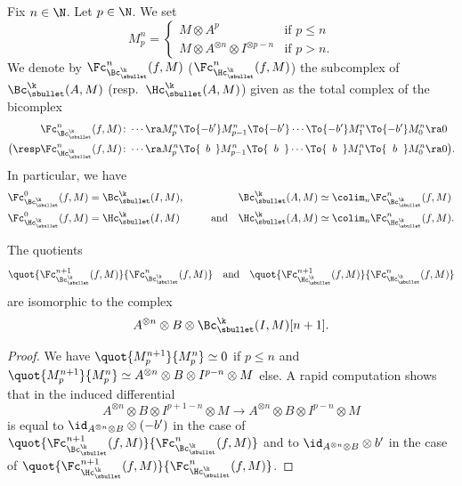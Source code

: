Fix $n \in \N$. Let $p \in \N$. We set
\[
M^n_p = \begin{cases}
M \otimes A^p & \text{if } p \leq n \\
M \otimes A^{\otimes n} \otimes I^{\otimes p-n} & \text{if } p > n.
\end{cases}
\]
We denote by $\Fc_{\Bc_\sbullet^\k}^n(f,M)$ (\resp $\Fc_{\Hc_\sbullet^\k}^n(f,M)$) the subcomplex of $\Bc_\sbullet^\k(A,M)$ (resp.\ $\Hc_\sbullet^\k(A,M)$) given as the total complex of the bicomplex
\begin{align*}
\Fc_{\Bc_\sbullet^\k}^n(f,M) \colon& \cdots \ra M^n_p \To{-b'} M^n_{p-1} \To{-b'} \cdots \To{-b'} M^n_1 \To{-b'} M^n_0 \ra 0 \\
\bigl(\resp \Fc_{\Hc_\sbullet^\k}^n(f,M) \colon& \cdots \ra M^n_p \To{\hspace*{1.7mm}b\hspace*{1.7mm}} M^n_{p-1} \To{\hspace*{1.9mm}b\hspace*{1.9mm}} \cdots \To{\hspace*{1.8mm}b\hspace*{1.9mm}} M^n_1 \To{\hspace*{2mm}b\hspace*{2mm}} M^n_0 \ra 0  \bigr).
\end{align*}
In particular, we have
\begin{align*}
\Fc_{\Bc_\sbullet^\k}^0(f,M) &= \Bc_\sbullet^\k(I,M) \text{, }& \Bc_\sbullet^\k(A,M) &\simeq \colim_n \Fc_{\Bc_\sbullet^\k}^n(f,M) \\
\Fc_{\Hc_\sbullet^\k}^0(f,M) &= \Hc_\sbullet^\k(I,M)\qquad\quad\text{and}& \Hc_\sbullet^\k(A,M) &\simeq \colim_n \Fc_{\Hc_\sbullet^\k}^n(f,M).
\end{align*}
\begin{lem}\label{lem:filtrationF}
The quotients
\[
\quot{\Fc_{\Bc_\sbullet^\k}^{n+1}(f,M)}{\Fc_{\Bc_\sbullet^\k}^n(f,M)}\quad\text{and}\quad\quot{\Fc_{\Hc_\sbullet^\k}^{n+1}(f,M)}{\Fc_{\Hc_\sbullet^\k}^n(f,M)}
\]
are isomorphic to the complex
\[
A^{\otimes n} \otimes B \otimes \Bc_\sbullet^\k(I,M)[n+1].
\]
\end{lem}
\begin{proof}
We have $\quot{M^{n+1}_p}{M^n_p} \simeq 0$ if $p \leq n$ and $\quot{M^{n+1}_p}{M^n_p} \simeq A^{\otimes n} \otimes B \otimes I^{p-n} \otimes M$ else.
A rapid computation shows that in the induced differential
\[
A^{\otimes n} \otimes B \otimes I^{p+1-n} \otimes M \to A^{\otimes n} \otimes B \otimes I^{p-n} \otimes M
\]
is equal to $\id_{A^{\otimes n} \otimes B} \otimes (-b')$ in the case of $\quot{\Fc_{\Bc_\sbullet^\k}^{n+1}(f,M)}{\Fc_{\Bc_\sbullet^\k}^n(f,M)}$ and to $\id_{A^{\otimes n} \otimes B} \otimes b'$ in the case of $\quot{\Fc_{\Hc_\sbullet^\k}^{n+1}(f,M)}{\Fc_{\Hc_\sbullet^\k}^n(f,M)}$.
\end{proof}

